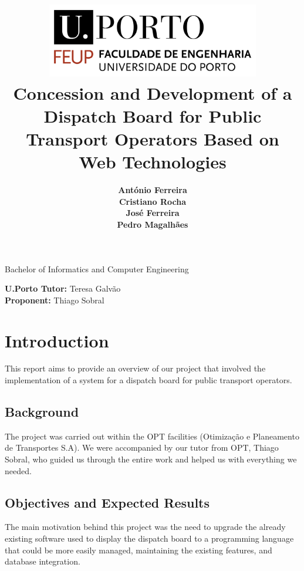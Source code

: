 \documentclass{article}
\begin{document}
\begin{center}

\title{\includegraphics[width=0.7\textwidth]{images/feup.png}\break\textbf{\LARGE Concession and Development of a Dispatch Board for Public Transport Operators Based on Web Technologies}}


\author{\textbf{António Ferreira} \\ \textbf{Cristiano Rocha} \\ \textbf{José Ferreira} \\ \textbf{Pedro Magalhães}}

\maketitle

Bachelor of Informatics and Computer Engineering \\
\vspace{1cm}

\textbf{U.Porto Tutor:} Teresa Galvão \\
\textbf{Proponent:} Thiago Sobral
\end{center}
\newpage

\section{Introduction}

This report aims to provide an overview of our project that involved the implementation of a system for a dispatch board for public transport operators.

\subsection{Background}

The project was carried out within the OPT facilities (Otimização e Planeamento de Transportes S.A). We were accompanied by our tutor from OPT, Thiago Sobral, who guided us through the entire work and helped us with everything we needed.

\subsection{Objectives and Expected Results}
The main motivation behind this project was the need to upgrade the already existing software used to display the dispatch board to a programming language that could be more easily managed, maintaining the existing features, and database integration. 
\end{document}

